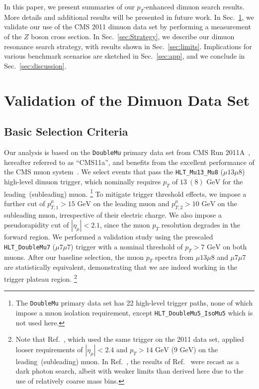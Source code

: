 \documentclass[aps,prd,twocolumn,superscriptaddress,preprintnumbers,nofootinbib,longbibliography,floatfix]{revtex4-1}
\newcommand{\nameofsearch}{$p_T$-enhanced }
\newcommand{\GeV}{\text{~GeV}}
\DeclareRobustCommand{\Sec}[1]{Sec.~\ref{#1}}
\DeclareRobustCommand{\Ref}[1]{Ref.~\cite{#1}}
\begin{document}
In this paper, we present summaries of our \nameofsearch dimuon search results.
%
More details and additional results will be presented in future work.
%
In \Sec{sec:ZXsec}, we validate our use of the CMS 2011 dimuon data set by performing a measurement of the $Z$ boson cross section.
%
In \Sec{sec:Strategy}, we describe our dimuon resonance search strategy, with results shown in \Sec{sec:limits}.
%
Implications for various benchmark scenarios are sketched in \Sec{sec:app}, and we conclude in \Sec{sec:discussion}.


\section{Validation of the Dimuon Data Set}
\label{sec:ZXsec}

\subsection{Basic Selection Criteria}


Our analysis is based on the \texttt{DoubleMu} primary data set from CMS Run 2011A~\cite{CMS:DiMuonPrimary}, hereafter referred to as ``CMS11a'', 
and benefits from the excellent performance of the CMS muon system~\cite{Chatrchyan:2012xi,Chatrchyan:2013sba}.
%
We select events that pass the \texttt{HLT\_Mu13\_Mu8} ($\mu13\mu8$) high-level dimuon trigger, which nominally requires $p_T$ of $13~(8) \GeV$ for the leading~(subleading) muon.%
%
\footnote{The \texttt{DoubleMu} primary data set has 22 high-level trigger paths, none of which impose a muon isolation requirement, except \texttt{HLT\_DoubleMu5\_IsoMu5} which is not used here.}
%
To mitigate trigger threshold effects, we impose a further cut of $p_{T,1}^\mu > 15 \GeV$ on the leading muon and $p_{T,2}^\mu > 10 \GeV$ on the subleading muon, irrespective of their electric charge.
%
We also impose a pseudorapidity cut of $|\eta_\mu| < 2.1$, since the muon $p_T$ resolution degrades in the forward region.
%
We performed a validation study using the prescaled \texttt{HLT\_DoubleMu7}  ($\mu7\mu7$) trigger with a nominal threshold of $p_{T} > 7 \GeV$ on both muons.
%
After our baseline selection, the muon $p_T$ spectra from $\mu13\mu8$ and $\mu7\mu7$ are statistically equivalent, demonstrating that we are indeed working in the trigger plateau region.%
%
\footnote{Note that \Ref{Chatrchyan:2013tia}, which used the same trigger on the 2011 data set, applied looser requirements of $|\eta_\mu| < 2.4$ and $p_T > 14 \GeV$ ($9 \GeV$) on the leading~(subleading) muon.
%
In \Ref{Hoenig:2014dsa}, the results of \Ref{Chatrchyan:2013tia} were recast as a dark photon search, albeit with weaker limits than derived here due to the use of relatively coarse mass bins.}
\end{document}
